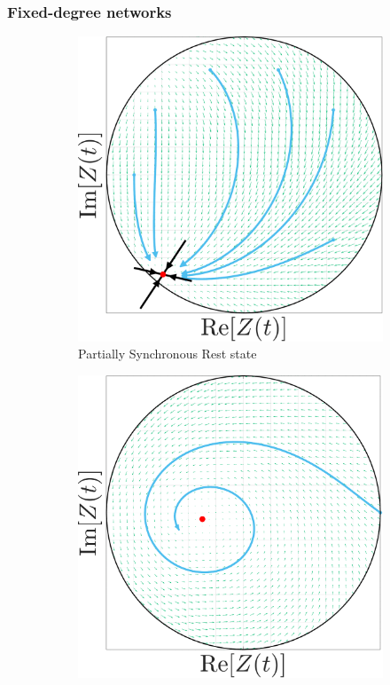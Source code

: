 \begin{frame}
\frametitle{Fixed-degree networks}
\begin{figure}[H]
\centering
\begin{subfigure}[b]{0.32\linewidth}
   \centering
  \includegraphics[width=\linewidth]{../Figures/PhaseSpace/MFRPSR.pdf}
  \caption{Partially Synchronous Rest state}
   \label{fig:MFRPSR} 
\end{subfigure} \hfill
\begin{subfigure}[b]{0.32\linewidth}
   \centering
  \includegraphics[width=\linewidth]{../Figures/PhaseSpace/MFRPSS.pdf}

\end{subfigure}
\end{figure}
\end{frame}
